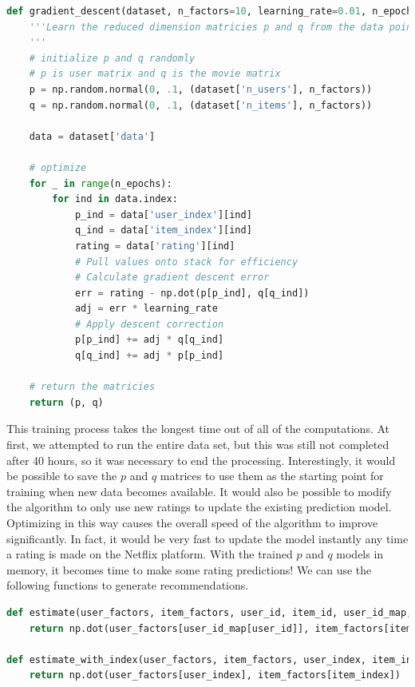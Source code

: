 \documentclass[11pt,a4paper]{article}
\begin{document}
\begin{lstlisting}[language=Python]
def gradient_descent(dataset, n_factors=10, learning_rate=0.01, n_epochs=10):
    '''Learn the reduced dimension matricies p and q from the data points in the data array
    '''
    # initialize p and q randomly
    # p is user matrix and q is the movie matrix
    p = np.random.normal(0, .1, (dataset['n_users'], n_factors))
    q = np.random.normal(0, .1, (dataset['n_items'], n_factors))

    data = dataset['data']

    # optimize
    for _ in range(n_epochs):
        for ind in data.index:
            p_ind = data['user_index'][ind]
            q_ind = data['item_index'][ind]
            rating = data['rating'][ind]
            # Pull values onto stack for efficiency
            # Calculate gradient descent error
            err = rating - np.dot(p[p_ind], q[q_ind])
            adj = err * learning_rate
            # Apply descent correction
            p[p_ind] += adj * q[q_ind]
            q[q_ind] += adj * p[p_ind]

    # return the matricies
    return (p, q)


\end{lstlisting}

This training process takes the longest time out of all of the computations. At first, we attempted to run the entire data set, but this was still not completed after 40 hours, so it was necessary to end the processing. Interestingly, it would be possible to save the $p$ and $q$ matrices to use them as the starting point for training when new data becomes available. It would also be possible to modify the algorithm to only use new ratings to update the existing prediction model. Optimizing in this way causes the overall speed of the algorithm to improve significantly. In fact, it would be very fast to update the model instantly any time a rating is made on the Netflix platform.
With the trained $p$ and $q$ models in memory, it becomes time to make some rating predictions! We can use the following functions to generate recommendations.

\begin{lstlisting}[language=Python]
def estimate(user_factors, item_factors, user_id, item_id, user_id_map, item_id_map):
    return np.dot(user_factors[user_id_map[user_id]], item_factors[item_id_map[item_id]])

def estimate_with_index(user_factors, item_factors, user_index, item_index):
    return np.dot(user_factors[user_index], item_factors[item_index])
\end{lstlisting}
\end{document}
